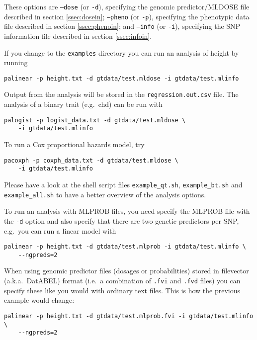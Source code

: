 \documentclass[12pt,a4paper]{article}
\begin{document}
These options are \texttt{--dose} (or \texttt{-d}), specifying the
genomic predictor/MLDOSE file described in section \ref{ssec:dosein};
\texttt{--pheno} (or \texttt{-p}), specifying the phenotypic data file
described in section \ref{ssec:phenoin}; and \texttt{--info} (or
\texttt{-i}), specifying the SNP information file described in section
\ref{ssec:infoin}.

If you change to the \texttt{examples} directory you can run
an analysis of height by running
\begin{verbatim}
palinear -p height.txt -d gtdata/test.mldose -i gtdata/test.mlinfo
\end{verbatim}
Output from the analysis will be stored in the
\texttt{regression.out.csv} file.
The analysis of a binary trait (e.g.~chd) can be run with
\begin{verbatim}
palogist -p logist_data.txt -d gtdata/test.mldose \
    -i gtdata/test.mlinfo
\end{verbatim}
To run a Cox proportional hazards model, try
\begin{verbatim}
pacoxph -p coxph_data.txt -d gtdata/test.mldose \
    -i gtdata/test.mlinfo
\end{verbatim}

Please have a look at the shell script files \texttt{example\_qt.sh},
\texttt{example\_bt.sh} and \texttt{example\_all.sh} to have
a better overview of the analysis options.

To run an analysis with MLPROB files, you need specify the MLPROB file
with the \texttt{-d} option and also specify that there are two
genetic predictors per SNP, e.g.~you can run a linear model with
\begin{verbatim}
palinear -p height.txt -d gtdata/test.mlprob -i gtdata/test.mlinfo \
    --ngpreds=2
\end{verbatim}

When using genomic predictor files (dosages or probabilities) stored
in filevector (a.k.a.~DatABEL) format (i.e.~a combination of
\texttt{.fvi} and \texttt{.fvd} files) you can specify these like you
would with ordinary text files. This is how the previous example would
change:
\begin{verbatim}
palinear -p height.txt -d gtdata/test.mlprob.fvi -i gtdata/test.mlinfo \
    --ngpreds=2
\end{verbatim}
\end{document}

